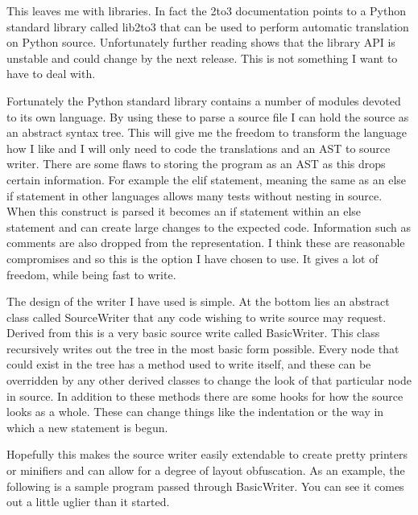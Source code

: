 \documentclass{report}
\begin{document}
This leaves me with libraries. In fact the 2to3 documentation points to a Python standard library called lib2to3 that can be used to
perform automatic translation on Python source. Unfortunately further reading shows that the library API is unstable and could change by
the next release. This is not something I want to have to deal with.

Fortunately the Python standard library contains a number of modules devoted to its own language. By using these to parse a source file
I can hold the source as an abstract syntax tree. This will give me the freedom to transform the language how I like and I will only need
to code the translations and an AST to source writer. There are some flaws to storing the program as an AST as this drops certain information.
For example the elif statement, meaning the same as an else if statement in other languages allows many tests without nesting in source.
When this construct is parsed it becomes an if statement within an else statement and can create large changes to the expected code. Information
such as comments are also dropped from the representation. I think these are reasonable compromises and so this is the option I have chosen
to use. It gives a lot of freedom, while being fast to write.

The design of the writer I have used is simple. At the bottom lies an abstract class called SourceWriter that any code wishing to write
source may request. Derived from this is a very basic source write called BasicWriter. This class recursively writes out the tree in the
most basic form possible. Every node that could exist in the tree has a method used to write itself, and these can be overridden by any
other derived classes to change the look of that particular node in source. In addition to these methods there are some hooks for how
the source looks as a whole. These can change things like the indentation or the way in which a new statement is begun.

Hopefully this makes the source writer easily extendable to create pretty printers or minifiers and can allow for a degree of layout
obfuscation. As an example, the following is a sample program passed through BasicWriter. You can see it comes out a little uglier than
it started.
\end{document}
